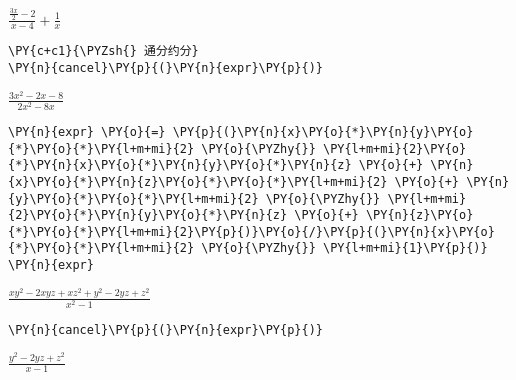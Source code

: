             
    
    $\displaystyle \frac{\frac{3 x}{2} - 2}{x - 4} + \frac{1}{x}$

    

    \begin{tcolorbox}[breakable, size=fbox, boxrule=1pt, pad at break*=1mm,colback=cellbackground, colframe=cellborder]
\begin{Verbatim}[commandchars=\\\{\}]
\PY{c+c1}{\PYZsh{} 通分约分}
\PY{n}{cancel}\PY{p}{(}\PY{n}{expr}\PY{p}{)}
\end{Verbatim}
\end{tcolorbox}
 
            
    
    $\displaystyle \frac{3 x^{2} - 2 x - 8}{2 x^{2} - 8 x}$

    

    \begin{tcolorbox}[breakable, size=fbox, boxrule=1pt, pad at break*=1mm,colback=cellbackground, colframe=cellborder]
\begin{Verbatim}[commandchars=\\\{\}]
\PY{n}{expr} \PY{o}{=} \PY{p}{(}\PY{n}{x}\PY{o}{*}\PY{n}{y}\PY{o}{*}\PY{o}{*}\PY{l+m+mi}{2} \PY{o}{\PYZhy{}} \PY{l+m+mi}{2}\PY{o}{*}\PY{n}{x}\PY{o}{*}\PY{n}{y}\PY{o}{*}\PY{n}{z} \PY{o}{+} \PY{n}{x}\PY{o}{*}\PY{n}{z}\PY{o}{*}\PY{o}{*}\PY{l+m+mi}{2} \PY{o}{+} \PY{n}{y}\PY{o}{*}\PY{o}{*}\PY{l+m+mi}{2} \PY{o}{\PYZhy{}} \PY{l+m+mi}{2}\PY{o}{*}\PY{n}{y}\PY{o}{*}\PY{n}{z} \PY{o}{+} \PY{n}{z}\PY{o}{*}\PY{o}{*}\PY{l+m+mi}{2}\PY{p}{)}\PY{o}{/}\PY{p}{(}\PY{n}{x}\PY{o}{*}\PY{o}{*}\PY{l+m+mi}{2} \PY{o}{\PYZhy{}} \PY{l+m+mi}{1}\PY{p}{)}
\PY{n}{expr}
\end{Verbatim}
\end{tcolorbox}
 
            
    
    $\displaystyle \frac{x y^{2} - 2 x y z + x z^{2} + y^{2} - 2 y z + z^{2}}{x^{2} - 1}$

    

    \begin{tcolorbox}[breakable, size=fbox, boxrule=1pt, pad at break*=1mm,colback=cellbackground, colframe=cellborder]
\begin{Verbatim}[commandchars=\\\{\}]
\PY{n}{cancel}\PY{p}{(}\PY{n}{expr}\PY{p}{)}
\end{Verbatim}
\end{tcolorbox}
 
            
    
    $\displaystyle \frac{y^{2} - 2 y z + z^{2}}{x - 1}$
